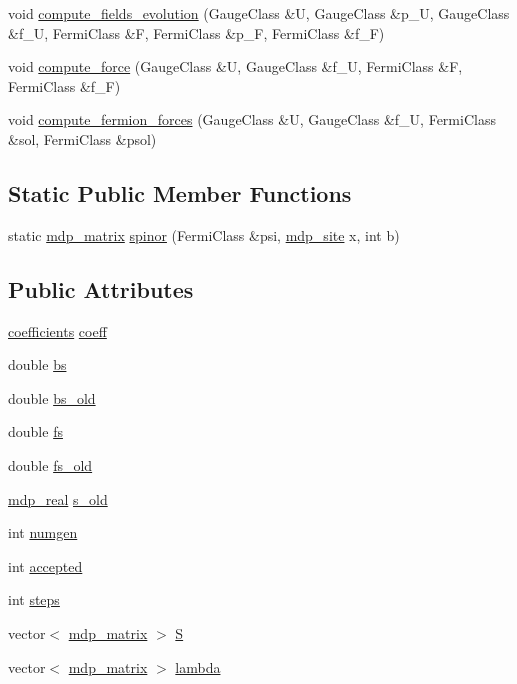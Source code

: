 \begin{DoxyCompactItemize}
\item 
void \hyperlink{class_h_m_c_aa91216c67c4304558aa47b9011abb9d2}{compute\+\_\+fields\+\_\+evolution} (Gauge\+Class \&U, Gauge\+Class \&p\+\_\+U, Gauge\+Class \&f\+\_\+U, Fermi\+Class \&F, Fermi\+Class \&p\+\_\+F, Fermi\+Class \&f\+\_\+F)
\item 
void \hyperlink{class_h_m_c_a055e331f19f692a381f098e02f939e79}{compute\+\_\+force} (Gauge\+Class \&U, Gauge\+Class \&f\+\_\+U, Fermi\+Class \&F, Fermi\+Class \&f\+\_\+F)
\item 
void \hyperlink{class_h_m_c_a2e84b43878a9162a4370c6272f7db6ac}{compute\+\_\+fermion\+\_\+forces} (Gauge\+Class \&U, Gauge\+Class \&f\+\_\+U, Fermi\+Class \&sol, Fermi\+Class \&psol)
\end{DoxyCompactItemize}
\subsection*{Static Public Member Functions}
\begin{DoxyCompactItemize}
\item 
static \hyperlink{classmdp__matrix}{mdp\+\_\+matrix} \hyperlink{class_h_m_c_a95adca9cab9649becfe31b5f346713d9}{spinor} (Fermi\+Class \&psi, \hyperlink{classmdp__site}{mdp\+\_\+site} x, int b)
\end{DoxyCompactItemize}
\subsection*{Public Attributes}
\begin{DoxyCompactItemize}
\item 
\hyperlink{classcoefficients}{coefficients} \hyperlink{class_h_m_c_aa7a373acc998a08fcdc2e86dc6084b7b}{coeff}
\item 
double \hyperlink{class_h_m_c_a940413017301b1520e4c6108a527c7c9}{bs}
\item 
double \hyperlink{class_h_m_c_a4146b7b06fcf3410b9bfda1c88c5fe39}{bs\+\_\+old}
\item 
double \hyperlink{class_h_m_c_ae7be326ed9dadc4876de7f60dd683e37}{fs}
\item 
double \hyperlink{class_h_m_c_a4f80874711a6599cb8c579dda6e088fb}{fs\+\_\+old}
\item 
\hyperlink{mdp__global__vars_8h_a69d96b74c791e0bbdb888b3913a69450}{mdp\+\_\+real} \hyperlink{class_h_m_c_a54ce598a989a71f3bfbb58057dcea2ed}{s\+\_\+old}
\item 
int \hyperlink{class_h_m_c_a37d9344bc22f5964bc6e129c1987602a}{numgen}
\item 
int \hyperlink{class_h_m_c_a11cb072cbdfddf4f6f6055bc77ae6b3a}{accepted}
\item 
int \hyperlink{class_h_m_c_a0254c831e713cdad8e2bbec4c247c045}{steps}
\item 
vector$<$ \hyperlink{classmdp__matrix}{mdp\+\_\+matrix} $>$ \hyperlink{class_h_m_c_a6007dbb2f937f629bbf5253a915b18fa}{S}
\item 
vector$<$ \hyperlink{classmdp__matrix}{mdp\+\_\+matrix} $>$ \hyperlink{class_h_m_c_a49121fbbef9d15281bc5a045fa0d07ce}{lambda}
\end{DoxyCompactItemize}
